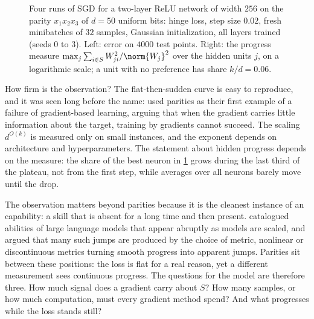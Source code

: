 \begin{refsection}
\begin{figure}[t]
\centering
{}
\caption{Four runs of SGD for a two-layer ReLU network of width $256$ on the parity $x_1x_2x_3$ of $d=50$ uniform bits: hinge loss, step size $0.02$, fresh minibatches of $32$ samples, Gaussian initialization, all layers trained (seeds $0$ to $3$). Left: error on $4000$ test points. Right: the progress measure $\max_j\sum_{i\in S}W_{ji}^2/\norm{W_j}^2$ over the hidden units $j$, on a logarithmic scale; a unit with no preference has share $k/d=0.06$.}\label{fig:parity:mlp}
\end{figure}

How firm is the observation? The flat-then-sudden curve is easy to reproduce, and it was seen long before the name: \textcite{ShalevShwartzShamirShammah2017} used parities as their first example of a failure of gradient-based learning, arguing that when the gradient carries little information about the target, training by gradients cannot succeed. The scaling $d^{O(k)}$ is measured only on small instances, and the exponent depends on architecture and hyperparameters. The statement about hidden progress depends on the measure: the share of the best neuron in \cref{fig:parity:mlp} grows during the last third of the plateau, not from the first step, while averages over all neurons barely move until the drop.

The observation matters beyond parities because it is the cleanest instance of an  capability: a skill that is absent for a long time and then present. \Textcite{WeiEtAl2022} catalogued abilities of large language models that appear abruptly as models are scaled, and \textcite{SchaefferMirandaKoyejo2023} argued that many such jumps are produced by the choice of metric, nonlinear or discontinuous metrics turning smooth progress into apparent jumps. Parities sit between these positions: the loss is flat for a real reason, yet a different measurement sees continuous progress. The questions for the model are therefore three. How much signal does a gradient carry about $S$? How many samples, or how much computation, must every gradient method spend? And what progresses while the loss stands still?


\end{refsection}

